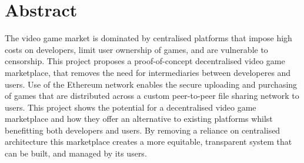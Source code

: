 \section*{Abstract}

The video game market is dominated by centralised platforms that impose high costs on developers, limit user ownership of games, and are vulnerable to censorship. This project proposes a proof-of-concept decentralised video game marketplace, that removes the need for intermediaries between developeres and users. Use of the Ethereum network enables the secure uploading and purchasing of games that are distributed across a custom peer-to-peer file sharing network to users.
\x
This project shows the potential for a decentralised video game marketplace and how they offer an alternative to existing platforms whilst benefitting both developers and users. By removing a reliance on centralised architecture this marketplace creates a more equitable, transparent system that can be built, and managed by its users.